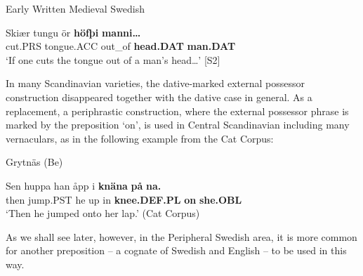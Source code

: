 
\item 

Early Written Medieval Swedish



 \ea\label{}
\gll Skiær  tungu  ör  \textbf{höfþi}\textbf{  manni…}\\


cut.PRS  tongue.ACC  out\_of  \textbf{head.DAT} \textbf{man.DAT}\\

\glt ‘If one cuts the tongue out of a man’s head…’ [S2]

\z

In many Scandinavian varieties, the dative-marked external possessor construction disappeared together with the dative case in general. As a replacement, a periphrastic construction, where the external possessor phrase is marked by the preposition  ‘on’, is used in Central Scandinavian including many vernaculars, as in the following example from the Cat Corpus: 


\item 

Grytnäs (Be) 



 \ea\label{}
\gll Sen  huppa  han  åpp  i  \textbf{knäna} \textbf{på} \textbf{na.}\\


then  jump.PST  he  up  in  \textbf{knee.DEF.PL} \textbf{on} \textbf{she.OBL}\\

\glt ‘Then he jumped onto her lap.’ (Cat Corpus)

\z

As we shall see later, however, in the Peripheral Swedish area, it is more common for another preposition – a cognate of Swedish  and English  – to be used in this way.

